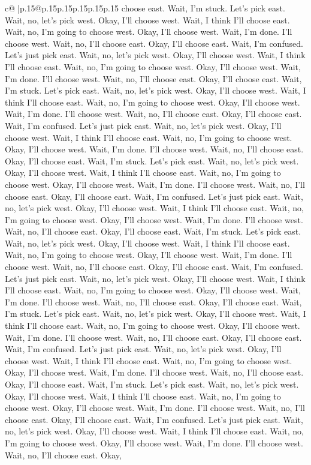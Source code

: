 \documentclass{article}
\begin{document}
{\begin{supertabular}{c@{$\;$}|p{.15\linewidth}@{}p{.15\linewidth}p{.15\linewidth}p{.15\linewidth}p{.15\linewidth}p{.15\linewidth}}
{{{choose east. Wait, I'm stuck. Let's pick east. Wait, no, let's pick west. Okay, I'll choose west. Wait, I think I'll choose east. Wait, no, I'm going to choose west. Okay, I'll choose west. Wait, I'm done. I'll choose west. Wait, no, I'll choose east. Okay, I'll choose east. Wait, I'm confused. Let's just pick east. Wait, no, let's pick west. Okay, I'll choose west. Wait, I think I'll choose east. Wait, no, I'm going to choose west. Okay, I'll choose west. Wait, I'm done. I'll choose west. Wait, no, I'll choose east. Okay, I'll choose east. Wait, I'm stuck. Let's pick east. Wait, no, let's pick west. Okay, I'll choose west. Wait, I think I'll choose east. Wait, no, I'm going to choose west. Okay, I'll choose west. Wait, I'm done. I'll choose west. Wait, no, I'll choose east. Okay, I'll choose east. Wait, I'm confused. Let's just pick east. Wait, no, let's pick west. Okay, I'll choose west. Wait, I think I'll choose east. Wait, no, I'm going to choose west. Okay, I'll choose west. Wait, I'm done. I'll choose west. Wait, no, I'll choose east. Okay, I'll choose east. Wait, I'm stuck. Let's pick east. Wait, no, let's pick west. Okay, I'll choose west. Wait, I think I'll choose east. Wait, no, I'm going to choose west. Okay, I'll choose west. Wait, I'm done. I'll choose west. Wait, no, I'll choose east. Okay, I'll choose east. Wait, I'm confused. Let's just pick east. Wait, no, let's pick west. Okay, I'll choose west. Wait, I think I'll choose east. Wait, no, I'm going to choose west. Okay, I'll choose west. Wait, I'm done. I'll choose west. Wait, no, I'll choose east. Okay, I'll choose east. Wait, I'm stuck. Let's pick east. Wait, no, let's pick west. Okay, I'll choose west. Wait, I think I'll choose east. Wait, no, I'm going to choose west. Okay, I'll choose west. Wait, I'm done. I'll choose west. Wait, no, I'll choose east. Okay, I'll choose east. Wait, I'm confused. Let's just pick east. Wait, no, let's pick west. Okay, I'll choose west. Wait, I think I'll choose east. Wait, no, I'm going to choose west. Okay, I'll choose west. Wait, I'm done. I'll choose west. Wait, no, I'll choose east. Okay, I'll choose east. Wait, I'm stuck. Let's pick east. Wait, no, let's pick west. Okay, I'll choose west. Wait, I think I'll choose east. Wait, no, I'm going to choose west. Okay, I'll choose west. Wait, I'm done. I'll choose west. Wait, no, I'll choose east. Okay, I'll choose east. Wait, I'm confused. Let's just pick east. Wait, no, let's pick west. Okay, I'll choose west. Wait, I think I'll choose east. Wait, no, I'm going to choose west. Okay, I'll choose west. Wait, I'm done. I'll choose west. Wait, no, I'll choose east. Okay, I'll choose east. Wait, I'm stuck. Let's pick east. Wait, no, let's pick west. Okay, I'll choose west. Wait, I think I'll choose east. Wait, no, I'm going to choose west. Okay, I'll choose west. Wait, I'm done. I'll choose west. Wait, no, I'll choose east. Okay, I'll choose east. Wait, I'm confused. Let's just pick east. Wait, no, let's pick west. Okay, I'll choose west. Wait, I think I'll choose east. Wait, no, I'm going to choose west. Okay, I'll choose west. Wait, I'm done. I'll choose west. Wait, no, I'll choose east. Okay, }}}
\end{supertabular}}
\end{document}
